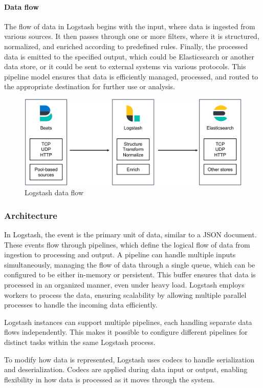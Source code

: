 \paragraph*{Data flow}
The flow of data in Logstash begins with the input, where data is ingested from various sources. 
It then passes through one or more filters, where it is structured, normalized, and enriched according to predefined rules. 
Finally, the processed data is emitted to the specified output, which could be Elasticsearch or another data store, or it could be sent to external systems via various protocols. 
This pipeline model ensures that data is efficiently managed, processed, and routed to the appropriate destination for further use or analysis.
\begin{figure}[H]
    \centering
    \includegraphics[width=0.75\linewidth]{images/ls.png}
    \caption{Logstash data flow}
\end{figure}

\subsubsection{Architecture}
In Logstash, the event is the primary unit of data, similar to a JSON document. 
These events flow through pipelines, which define the logical flow of data from ingestion to processing and output. 
A pipeline can handle multiple inputs simultaneously, managing the flow of data through a single queue, which can be configured to be either in-memory or persistent. 
This buffer ensures that data is processed in an organized manner, even under heavy load. 
Logstash employs workers to process the data, ensuring scalability by allowing multiple parallel processes to handle the incoming data efficiently.

Logstash instances can support multiple pipelines, each handling separate data flows independently. 
This makes it possible to configure different pipelines for distinct tasks within the same Logstash process.

To modify how data is represented, Logstash uses codecs to handle serialization and deserialization. 
Codecs are applied during data input or output, enabling flexibility in how data is processed as it moves through the system.

